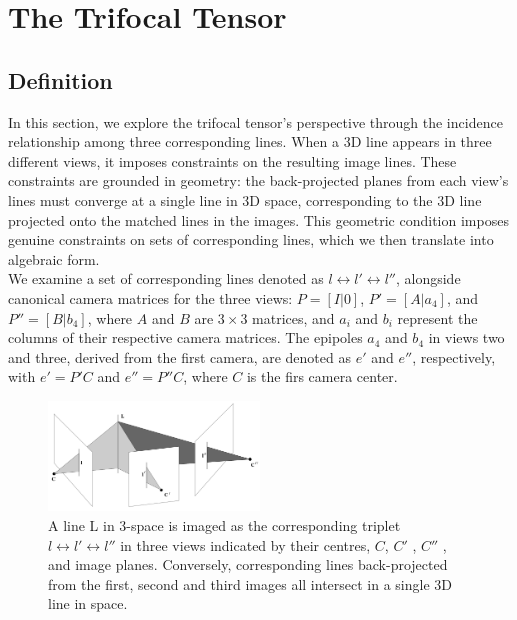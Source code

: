 \section{The Trifocal Tensor}\label{sec:tft}

\subsection{Definition}
In this section, we explore the trifocal tensor's perspective through the incidence relationship among three corresponding lines. When a 3D line appears in three different views, it imposes constraints on the resulting image lines. These constraints are grounded in geometry: the back-projected planes from each view's lines must converge at a single line in 3D space, corresponding to the 3D line projected onto the matched lines in the images. This geometric condition imposes genuine constraints on sets of corresponding lines, which we then translate into algebraic form.\\

We examine a set of corresponding lines denoted as \( l \leftrightarrow l' \leftrightarrow l'' \), alongside canonical camera matrices for the three views: \( P = [I|0] \), \( P' = [A|a_4] \), and \( P'' = [B|b_4] \), where \( A \) and \( B \) are \( 3 \times 3 \) matrices, and \( a_i \) and \( b_i \) represent the columns of their respective camera matrices. The epipoles \( a_4 \) and \( b_4 \) in views two and three, derived from the first camera, are denoted as \( e' \) and \( e'' \), respectively, with \( e' = P'C \) and \( e'' = P''C \), where \( C \) is the firs camera center.

\begin{figure}[h]
	\centering
	\includegraphics[width=0.5\textwidth]{Report/Figures/three-views.png}
	\caption{A line L in 3-space is imaged as the corresponding triplet \( l \leftrightarrow l' \leftrightarrow l'' \) in three views indicated by their centres, \( C \), \( C' \) , \( C'' \) , and image planes. Conversely, corresponding lines back-projected from the first, second and third images all intersect in a single 3D line in space.}
\end{figure}

